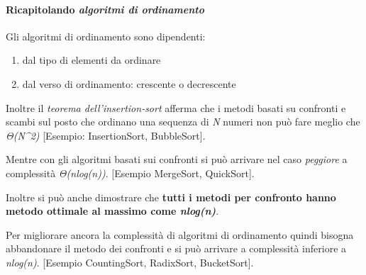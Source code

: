 \documentclass[
  paper=a4,
  oneside  ,captions=tableheading
]{scrbook}
\providecommand{\tightlist}{%
  \setlength{\itemsep}{0pt}\setlength{\parskip}{0pt}}
\begin{document}
\hypertarget{ricapitolando-algoritmi-di-ordinamento}{%
\paragraph{\texorpdfstring{Ricapitolando \emph{algoritmi di
ordinamento}}{Ricapitolando algoritmi di ordinamento}}\label{ricapitolando-algoritmi-di-ordinamento}}

Gli algoritmi di ordinamento sono dipendenti:

\begin{enumerate}
\def\labelenumi{\arabic{enumi}.}
\tightlist
\item
  dal tipo di elementi da ordinare
\item
  dal verso di ordinamento: crescente o decrescente
\end{enumerate}

Inoltre il \emph{teorema dell'insertion-sort} afferma che i metodi
basati su confronti e scambi sul posto che ordinano una sequenza di
\emph{N} numeri non può fare meglio che \emph{Θ(N\^{}2)} {[}Esempio:
InsertionSort, BubbleSort{]}.

Mentre con gli algoritmi basati sui confronti si può arrivare nel caso
\emph{peggiore} a complessità \emph{Θ(nlog(n))}. {[}Esempio MergeSort,
QuickSort{]}.

Inoltre si può anche dimostrare che \textbf{tutti i metodi per confronto
hanno metodo ottimale al massimo come \emph{nlog(n)}}.

Per migliorare ancora la complessità di algoritmi di ordinamento quindi
bisogna abbandonare il metodo dei confronti e si può arrivare a
complessità inferiore a \emph{nlog(n)}. {[}Esempio CountingSort,
RadixSort, BucketSort{]}.
\end{document}
